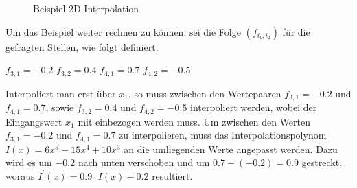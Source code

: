 \documentclass[11pt,a4paper]{article}
\begin{document}
\begin{center}
\begin{figure}[!ht]
\centering
{}
\caption[Beispiel 2D Interpolation]{Beispiel 2D Interpolation}
\end{figure}
\end{center}
\noindent
Um das Beispiel weiter rechnen zu können, sei die Folge $(f_{i_1, i_2})$ für die gefragten Stellen, wie folgt definiert:
\begin{center}
$f_{3, 1} = -0.2$ \hspace{10pt} $f_{3, 2} = 0.4$ \hspace{10pt} $f_{4, 1} = 0.7$ \hspace{10pt} $f_{4, 2} = -0.5$\\
\end{center}
\noindent
Interpoliert man erst über $x_1$, so muss zwischen den Wertepaaren $f_{3, 1} = -0.2$ und $f_{4, 1} = 0.7$, sowie $f_{3, 2} = 0.4$ und $f_{4, 2} = -0.5$ interpoliert werden, wobei der Eingangswert $x_1$ mit einbezogen werden muss. Um zwischen den Werten $f_{3, 1} = -0.2$ und $f_{4, 1} = 0.7$ zu interpolieren, muss das Interpolationspolynom $I(x) = 6x^5-15x^4+10x^3$ an die umliegenden Werte angepasst werden. Dazu wird es um $-0.2$ nach unten verschoben und um $0.7 - (-0.2) = 0.9$ gestreckt, woraus $I^\prime(x) = 0.9 \cdot I(x) - 0.2$ resultiert.
\end{document}

